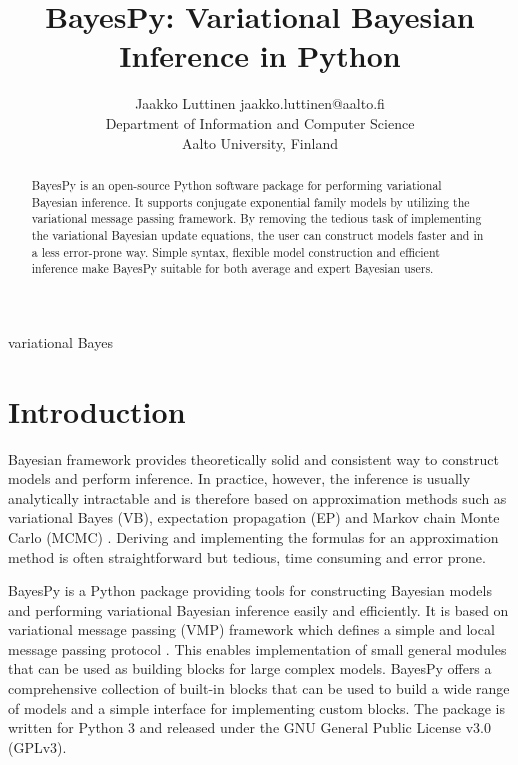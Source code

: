 \documentclass[twoside,11pt]{article}
\begin{document}
\title{BayesPy: Variational Bayesian Inference in Python}

\author{\name Jaakko Luttinen \email jaakko.luttinen@aalto.fi \\
       \addr Department of Information and Computer Science\\
       Aalto University, Finland}


\maketitle

\begin{abstract}%
  BayesPy is an open-source Python software package for performing variational
  Bayesian inference.  It supports conjugate exponential family models by
  utilizing the variational message passing framework.  By removing the tedious
  task of implementing the variational Bayesian update equations, the user can
  construct models faster and in a less error-prone way.  Simple syntax,
  flexible model construction and efficient inference make BayesPy suitable for
  both average and expert Bayesian users.
\end{abstract}

\begin{keywords}
  variational Bayes
\end{keywords}

\section{Introduction}

Bayesian framework provides theoretically solid and consistent way to construct
models and perform inference.  In practice, however, the inference is usually
analytically intractable and is therefore based on approximation methods such as
variational Bayes (VB), expectation propagation (EP) and Markov chain Monte
Carlo (MCMC) \citep{Bishop:2006}.  Deriving and implementing the formulas for an
approximation method is often straightforward but tedious, time consuming and
error prone.


BayesPy is a Python package providing tools for constructing Bayesian models and
performing variational Bayesian inference easily and efficiently.  It is based
on variational message passing (VMP) framework which defines a simple and local
message passing protocol \citep{Winn:2005}.  This enables implementation of small
general modules that can be used as building blocks for large complex models.
BayesPy offers a comprehensive collection of built-in blocks that can be used to
build a wide range of models and a simple interface for implementing custom
blocks.  The package is written for Python 3 and released under the GNU General
Public License v3.0 (GPLv3).
\end{document}
